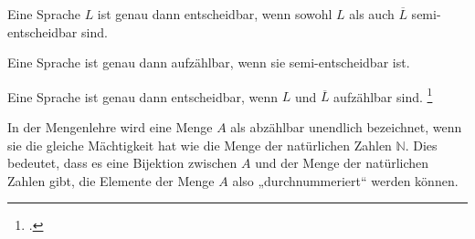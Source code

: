 \documentclass{lehramt-informatik-haupt}
\begin{document}
Eine Sprache $L$ ist genau dann entscheidbar, wenn sowohl $L$ als auch
$\overline{L}$ semi-entscheidbar sind.

Eine Sprache ist genau dann aufzählbar, wenn sie semi-entscheidbar ist.

Eine Sprache ist genau dann entscheidbar, wenn $L$ und $\overline{L}$
aufzählbar sind.
\footcite[Seite 39]{theo:fs:4}

\begin{liExkurs}
In der Mengenlehre wird eine Menge $A$ als abzählbar unendlich
bezeichnet, wenn sie die gleiche Mächtigkeit hat wie die Menge der
natürlichen Zahlen $\mathbb{N}$. Dies bedeutet, dass es eine Bijektion
zwischen $A$ und der Menge der natürlichen Zahlen gibt, die Elemente der
Menge $A$ also „durchnummeriert“ werden können.
\end{liExkurs}
\end{document}
